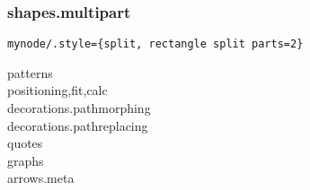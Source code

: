 \subsubsection{shapes.multipart}
\begin{lstlisting}
mynode/.style={split, rectangle split parts=2}
\end{lstlisting}
\begin{description}
\item [patterns]
\item [positioning,fit,calc]
\item [decorations.pathmorphing]
\item [decorations.pathreplacing]
\item [quotes]
\item [graphs]
\item [arrows.meta]
\end{description}





